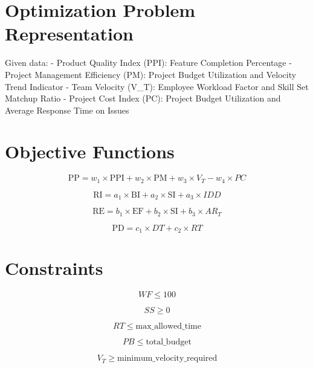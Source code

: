 \documentclass{article}
\begin{document}
\section*{Optimization Problem Representation}

Given data:
- Product Quality Index (PPI): Feature Completion Percentage
- Project Management Efficiency (PM): Project Budget Utilization and Velocity Trend Indicator
- Team Velocity (V_T): Employee Workload Factor and Skill Set Matchup Ratio
- Project Cost Index (PC): Project Budget Utilization and Average Response Time on Issues

\section*{Objective Functions}
\[ \text{PP} = w_1 \times \text{PPI} + w_2 \times \text{PM} + w_3 \times V_T - w_4 \times PC \]

\[ \text{RI} = a_1 \times \text{BI} + a_2 \times \text{SI} + a_3 \times IDD \]

\[ \text{RE} = b_1 \times \text{EF} + b_2 \times \text{SI} + b_3 \times AR_T \]

\[ \text{PD} = c_1 \times DT + c_2 \times RT \]

\section*{Constraints}
\[ WF \leq 100 \]

\[ SS \geq 0 \]

\[ RT \leq \text{max\_allowed\_time} \]

\[ PB \leq \text{total\_budget} \]

\[ V_T \geq \text{minimum\_velocity\_required} \]
\end{document}
